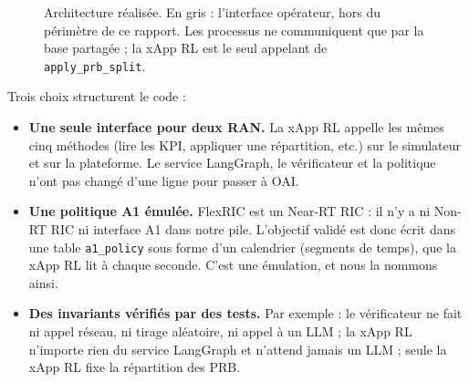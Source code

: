\documentclass[11pt,a4paper]{article}
\newcommand{\tool}[1]{\texttt{#1}}
\begin{document}
\begin{figure}[!htb]
\caption{Architecture réalisée. En gris : l'interface opérateur, hors du périmètre de ce rapport.
Les processus ne communiquent que par la base partagée ; la xApp RL est le seul appelant de
\tool{apply\_prb\_split}.}
\label{fig:archi}
\end{figure}

Trois choix structurent le code :
\begin{itemize}
  \item \textbf{Une seule interface pour deux RAN.} La xApp RL appelle les mêmes cinq méthodes
        (lire les KPI, appliquer une répartition, etc.) sur le simulateur et sur la plateforme.
        Le service LangGraph, le vérificateur et la politique n'ont pas changé d'une ligne pour
        passer à OAI.
  \item \textbf{Une politique A1 émulée.} FlexRIC est un Near-RT RIC : il n'y a ni Non-RT RIC
        ni interface A1 dans notre pile. L'objectif validé est donc écrit dans une table
        \tool{a1\_policy} sous forme d'un calendrier (segments de temps), que la xApp RL lit à
        chaque seconde. C'est une émulation, et nous la nommons ainsi.
  \item \textbf{Des invariants vérifiés par des tests.} Par exemple : le vérificateur ne fait
        ni appel réseau, ni tirage aléatoire, ni appel à un LLM ; la xApp RL n'importe rien du
        service LangGraph et n'attend jamais un LLM ; seule la xApp RL fixe la répartition des
        PRB.
\end{itemize}
\end{document}
